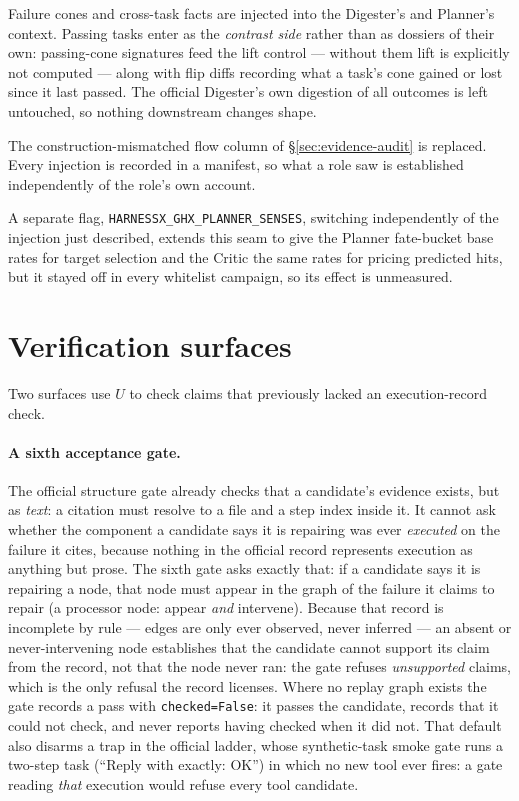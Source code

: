 Failure cones and cross-task facts are injected into the Digester's and
Planner's context. Passing tasks enter as the \emph{contrast side} rather
than as dossiers of their own: passing-cone signatures feed the lift
control --- without them lift is explicitly not computed --- along with
flip diffs recording what a task's cone gained or lost since it last
passed. The official Digester's own digestion of all outcomes is left
untouched, so nothing downstream changes shape.

The construction-mismatched flow column of \S\ref{sec:evidence-audit} is replaced. Every
injection is recorded in a manifest, so what a role saw is established
independently of the role's own account.

A separate flag, \texttt{HARNESSX\_GHX\_PLANNER\_SENSES}, switching
independently of the injection just described, extends this seam to give
the Planner fate-bucket base rates for target selection
and the Critic the same rates for pricing predicted hits, but it stayed off
in every whitelist campaign, so its effect is unmeasured.


\section{Verification surfaces}
\label{sec:verification}

Two surfaces use $U$ to check claims that previously lacked an execution-record check.

\paragraph{A sixth acceptance gate.} The official structure gate already
checks that a candidate's evidence exists, but as \emph{text}: a citation
must resolve to a file and a step index inside it. It cannot ask whether
the component a candidate says it is repairing was ever \emph{executed} on
the failure it cites, because nothing in the official record represents
execution as anything but prose. The sixth gate asks exactly that: if a
candidate says it is repairing a node, that node must appear in the graph
of the failure it claims to repair (a processor node: appear \emph{and}
intervene). Because that record is incomplete by
rule --- edges are only ever observed, never inferred --- an absent or
never-intervening node
establishes that the candidate cannot support its claim from the record,
not that the node never ran: the gate refuses \emph{unsupported} claims,
which is the only refusal the record licenses. Where no replay graph exists the gate records a pass with
\texttt{checked=False}: it passes the candidate, records that it could not
check, and never reports having checked when it did not. That default also
disarms a trap in the official ladder, whose synthetic-task smoke gate runs
a two-step task (``Reply with exactly: OK'') in which no new tool ever
fires: a gate reading \emph{that} execution would refuse every tool candidate.


